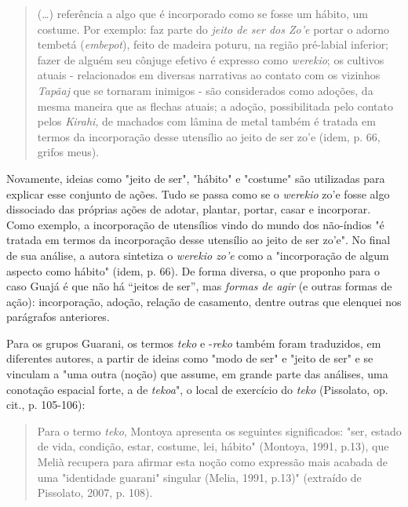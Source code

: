 \begin{quote}
(\ldots{}) referência a algo que é incorporado como se fosse um hábito,
um costume. Por exemplo: faz parte do \emph{jeito de ser dos Zo'e}
portar o adorno tembetá (\emph{embepot}), feito de madeira poturu, na
região pré-labial inferior; fazer de alguém seu cônjuge efetivo é
expresso como \emph{werekio}; os cultivos atuais - relacionados em
diversas narrativas ao contato com os vizinhos \emph{Tapãaj} que se
tornaram inimigos - são considerados como adoções, da mesma maneira que
as flechas atuais; a adoção, possibilitada pelo contato pelos
\emph{Kirahi}, de machados com lâmina de metal também é tratada em
termos da incorporação desse utensílio ao jeito de ser zo'e (idem, p.
66, grifos meus).
\end{quote}

Novamente, ideias como "jeito de ser", "hábito" e "costume" são
utilizadas para explicar esse conjunto de ações. Tudo se passa como se o
\emph{werekio} zo'e fosse algo dissociado das próprias ações de adotar,
plantar, portar, casar e incorporar. Como exemplo, a incorporação de
utensílios vindo do mundo dos não-índios "é tratada em termos da
incorporação desse utensílio ao jeito de ser zo'e". No final de sua
análise, a autora sintetiza o \emph{werekio zo'e} como a "incorporação
de algum aspecto como hábito" (idem, p. 66). De forma diversa, o que
proponho para o caso Guajá é que não há ``jeitos de ser'', mas
\emph{formas de agir} (e outras formas de ação): incorporação, adoção,
relação de casamento, dentre outras que elenquei nos parágrafos
anteriores.

Para os grupos Guarani, os termos \emph{teko} e -\emph{reko} também
foram traduzidos, em diferentes autores, a partir de ideias como "modo
de ser" e "jeito de ser" e se vinculam a "uma outra (noção) que assume,
em grande parte das análises, uma conotação espacial forte, a de
\emph{tekoa}", o local de exercício do \emph{teko} (Pissolato, op. cit.,
p. 105-106):

\begin{quote}
Para o termo \emph{teko}, Montoya apresenta os seguintes significados:
"ser, estado de vida, condição, estar, costume, lei, hábito" (Montoya,
1991, p.13), que Melià recupera para afirmar esta noção como expressão
mais acabada de uma "identidade guarani" singular (Melia, 1991, p.13)"
(extraído de Pissolato, 2007, p. 108).
\end{quote}

